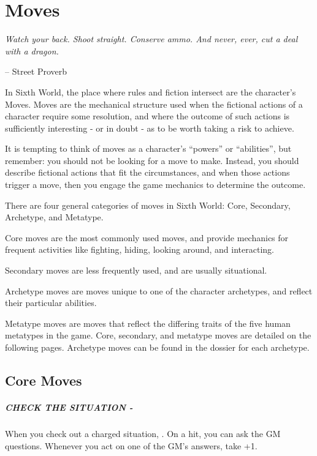 \chapter{Moves} \label{moves}

\epigraph{\textit{Watch your back. Shoot straight. Conserve ammo. And never, ever, cut a deal with a dragon.}}{-- Street Proverb}

In Sixth World, the place where rules and fiction intersect are the character’s Moves. Moves are the mechanical structure used when the fictional actions of a character require some resolution, and where the outcome of such actions is sufficiently interesting - or in doubt - as to be worth taking a risk to achieve.

It is tempting to think of moves as a character’s ``powers'' or ``abilities'', but remember: you should not be looking for a move to make. Instead, you should describe fictional actions that fit the circumstances, and when those actions trigger a move, then you engage the game mechanics to determine the outcome.

There are four general categories of moves in Sixth World: Core, Secondary, Archetype, and Metatype.

Core moves are the most commonly used moves, and provide mechanics for frequent activities like fighting, hiding, looking around, and interacting.

Secondary moves are less frequently used, and are usually situational.

Archetype moves are moves unique to one of the character archetypes, and reflect their particular abilities.

Metatype moves are moves that reflect the differing traits of the five human metatypes in the game. Core, secondary, and metatype moves are detailed on the following pages. Archetype moves can be found in the dossier for each archetype.

\clearpage
\section{Core Moves}

\paragraph{CHECK THE SITUATION -} When you check out a charged situation, . On a hit, you can ask the GM questions. Whenever you act on one of the GM’s answers, take +1.


